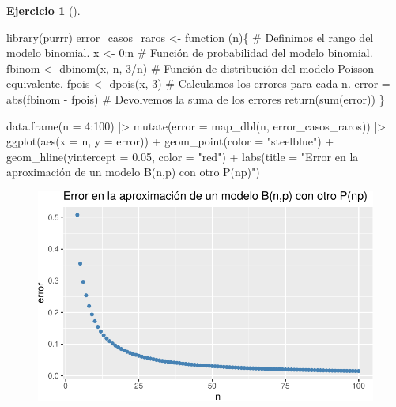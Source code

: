 \documentclass[
  a4paper,
]{scrreport}
\newenvironment{Shaded}{\begin{snugshade}}{\end{snugshade}}
\newcommand{\AttributeTok}[1]{\textcolor[rgb]{0.40,0.45,0.13}{#1}}
\newcommand{\CommentTok}[1]{\textcolor[rgb]{0.37,0.37,0.37}{#1}}
\newcommand{\ControlFlowTok}[1]{\textcolor[rgb]{0.00,0.23,0.31}{#1}}
\newcommand{\DecValTok}[1]{\textcolor[rgb]{0.68,0.00,0.00}{#1}}
\newcommand{\FloatTok}[1]{\textcolor[rgb]{0.68,0.00,0.00}{#1}}
\newcommand{\FunctionTok}[1]{\textcolor[rgb]{0.28,0.35,0.67}{#1}}
\newcommand{\NormalTok}[1]{\textcolor[rgb]{0.00,0.23,0.31}{#1}}
\newcommand{\OtherTok}[1]{\textcolor[rgb]{0.00,0.23,0.31}{#1}}
\newcommand{\SpecialCharTok}[1]{\textcolor[rgb]{0.37,0.37,0.37}{#1}}
\newcommand{\StringTok}[1]{\textcolor[rgb]{0.13,0.47,0.30}{#1}}
\theoremstyle{definition}
\newtheorem{exercise}{Ejercicio}[chapter]
\theoremstyle{remark}
\begin{document}
\begin{exercise}[]
\begin{enumerate}
\begin{tcolorbox}
\begin{Shaded}
\begin{Highlighting}[]
\FunctionTok{library}\NormalTok{(purrr)}
\NormalTok{error\_casos\_raros }\OtherTok{\textless{}{-}} \ControlFlowTok{function}\NormalTok{ (n)\{}
    \CommentTok{\# Definimos el rango del modelo binomial.}
\NormalTok{    x }\OtherTok{\textless{}{-}} \DecValTok{0}\SpecialCharTok{:}\NormalTok{n}
    \CommentTok{\# Función de probabilidad del modelo binomial.}
\NormalTok{    fbinom }\OtherTok{\textless{}{-}} \FunctionTok{dbinom}\NormalTok{(x, n, }\DecValTok{3}\SpecialCharTok{/}\NormalTok{n)}
    \CommentTok{\# Función de distribución del modelo Poisson equivalente.}
\NormalTok{    fpois }\OtherTok{\textless{}{-}} \FunctionTok{dpois}\NormalTok{(x, }\DecValTok{3}\NormalTok{)}
    \CommentTok{\# Calculamos los errores para cada n.}
\NormalTok{    error }\OtherTok{=} \FunctionTok{abs}\NormalTok{(fbinom }\SpecialCharTok{{-}}\NormalTok{ fpois)}
    \CommentTok{\# Devolvemos la suma de los errores}
    \FunctionTok{return}\NormalTok{(}\FunctionTok{sum}\NormalTok{(error))}
\NormalTok{\}}

\FunctionTok{data.frame}\NormalTok{(}\AttributeTok{n =} \DecValTok{4}\SpecialCharTok{:}\DecValTok{100}\NormalTok{)  }\SpecialCharTok{|\textgreater{}} 
    \FunctionTok{mutate}\NormalTok{(}\AttributeTok{error =} \FunctionTok{map\_dbl}\NormalTok{(n, error\_casos\_raros))  }\SpecialCharTok{|\textgreater{}} 
    \FunctionTok{ggplot}\NormalTok{(}\FunctionTok{aes}\NormalTok{(}\AttributeTok{x =}\NormalTok{ n, }\AttributeTok{y =}\NormalTok{ error)) }\SpecialCharTok{+}
    \FunctionTok{geom\_point}\NormalTok{(}\AttributeTok{color =} \StringTok{"steelblue"}\NormalTok{) }\SpecialCharTok{+}
    \FunctionTok{geom\_hline}\NormalTok{(}\AttributeTok{yintercept =} \FloatTok{0.05}\NormalTok{, }\AttributeTok{color =} \StringTok{"red"}\NormalTok{) }\SpecialCharTok{+}
    \FunctionTok{labs}\NormalTok{(}\AttributeTok{title =} \StringTok{"Error en la aproximación de un modelo B(n,p) con otro P(np)"}\NormalTok{)}
\end{Highlighting}
\end{Shaded}

  \begin{figure}[H]

  {\centering \includegraphics{06-distribuciones-probabilidad_files/figure-pdf/unnamed-chunk-19-1.pdf}

}
\end{figure}
\end{tcolorbox}
\end{enumerate}
\end{exercise}
\end{document}
